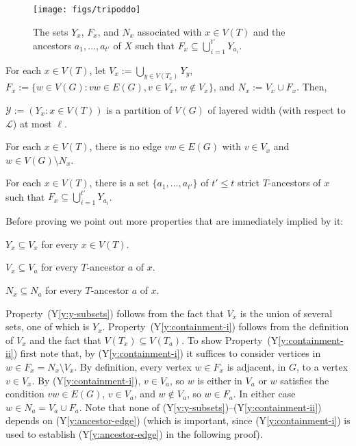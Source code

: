 \documentclass{patmorin}
\newcommand{\ylabel}[1]{\label{y:#1}}
\newcommand{\yref}[1]{(Y\ref{y:#1})}
\renewcommand{\le}{\leqslant}
\begin{document}
\begin{figure}
  \begin{center}
    \texttt{[image: figs/tripoddo]}
  \end{center}
  \caption{The sets $Y_x$, $F_x$, and $N_x$ associated with $x\in V(T)$
  and the ancestors $a_1,\ldots,a_{t'}$ of $X$ such that $F_x \subseteq \bigcup_{i=1}^{t'} Y_{a_i}$.}
  \label{fig:generalized-tripod}
\end{figure}


\begin{clm}
  For each $x\in V(T)$, let $V_x := \bigcup_{y\in V(T_x)} Y_y$, $F_x:=\{w\in V(G): vw\in E(G), v\in V_x,\, w\not\in V_x\}$, and $N_x:=V_x\cup F_x$.  Then, 
  \begin{compactenum}[(Y1)]
    \item\ylabel{thickness} $\mathcal{Y}:=(Y_x: x\in V(T))$ is a partition of $V(G)$ of layered width (with respect to $\mathcal{L}$) at most $\ell$.
    \item\ylabel{separator} For each $x\in V(T)$, there is no edge $vw\in E(G)$ with $v\in V_x$ and $w\in V(G)\setminus N_x$. 
    \item\ylabel{ancestor-edge} For each $x\in V(T)$, there is a set $\{a_1,\ldots,a_{t'}\}$ of $t'\le t$ strict $T$-ancestors of $x$ such that $F_x \subseteq \bigcup_{i=1}^{t'} Y_{a_i}$.
  \end{compactenum}
\end{clm}

Before proving  we point out more properties that are immediately implied by it:

\begin{compactenum}[(Y1)]\setcounter{enumi}{3}
  \item\ylabel{y-subsets} $Y_x\subseteq V_x$ for every $x\in V(T)$. 
  \item\ylabel{containment-i} $V_x\subseteq V_a$ for every $T$-ancestor $a$ of $x$. 
  \item\ylabel{containment-ii}$N_x\subseteq N_a$ for every $T$-ancestor $a$ of $x$.
\end{compactenum}

Property~\yref{y-subsets} follows from the fact that $V_x$ is the union of several sets, one of which is $Y_x$.  Property~\yref{containment-i} follows from the definition of $V_x$ and the fact that $V(T_x)\subseteq V(T_a)$. To show Property~\yref{containment-ii} first note that, by \yref{containment-i} it suffices to consider vertices in $w\in F_x=N_x\setminus V_x$. By definition, every vertex $w\in F_x$ is adjacent, in $G$, to a vertex $v\in V_x$.  By \yref{containment-i}, $v\in V_a$, so $w$ is either in $V_a$ or $w$ satisfies the condition $vw\in E(G)$, $v\in V_a$, and $w\not\in V_a$, so $w\in F_a$.  In either case $w\in N_a=V_a\cup F_a$.  Note that none of \yref{y-subsets}--\yref{containment-ii} depends on \yref{ancestor-edge} (which is important, since \yref{containment-i} is used to establish \yref{ancestor-edge} in the following proof).
\end{document}
